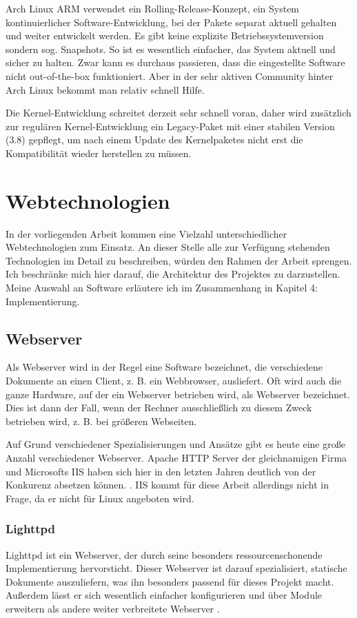 Arch Linux ARM verwendet ein Rolling-Release-Konzept, ein System kontinuierlicher Software-Entwicklung, bei der Pakete separat aktuell gehalten und weiter entwickelt werden. Es gibt keine explizite Betriebssystemversion sondern sog. Snapshots. So ist es  wesentlich einfacher, das System aktuell und sicher zu halten. Zwar kann es durchaus passieren, dass die eingestellte Software nicht out-of-the-box funktioniert. Aber in der sehr aktiven Community hinter Arch Linux bekommt man relativ schnell Hilfe.

Die Kernel-Entwicklung schreitet derzeit sehr schnell voran, daher wird zusätzlich zur regulären Kernel-Entwicklung  ein Legacy-Paket mit einer stabilen Version (3.8) gepflegt, um nach einem Update des Kernelpaketes nicht erst die Kompatibilität wieder herstellen zu müssen.


\section{Webtechnologien}
In der vorliegenden Arbeit kommen eine Vielzahl unterschiedlicher Webtechnologien zum Einsatz. An dieser Stelle alle zur Verfügung stehenden Technologien im Detail zu beschreiben, würden den Rahmen der Arbeit sprengen. Ich beschränke mich hier darauf, die Architektur des Projektes zu darzustellen. Meine Auswahl an Software erläutere ich im Zusammenhang in Kapitel 4: Implementierung.

\subsection{Webserver}
Als Webserver wird in der Regel eine Software bezeichnet, die verschiedene Dokumente an einen Client, z. B. ein Webbrowser, ausliefert. Oft wird auch die ganze Hardware, auf der ein Webserver betrieben wird, als Webserver bezeichnet. Dies ist dann der Fall, wenn der Rechner ausschließlich zu diesem Zweck betrieben wird, z. B. bei größeren Webseiten.

Auf Grund verschiedener Spezialisierungen und Ansätze gibt es heute eine große Anzahl verschiedener Webserver. Apache HTTP Server der gleichnamigen Firma und Microsofts IIS haben sich hier in den letzten Jahren deutlich von der Konkurenz absetzen können. \cite{webserversurvey1014}. IIS kommt für diese Arbeit allerdings nicht in Frage, da er nicht für Linux angeboten wird.

\subsubsection{Lighttpd}
Lighttpd ist ein Webserver, der durch seine besonders ressourcenschonende Implementierung hervorsticht. Dieser Webserver ist darauf spezialisiert, statische Dokumente auszuliefern, was ihn besonders passend für dieses Projekt macht. Außerdem lässt er sich wesentlich einfacher konfigurieren und über Module erweitern als andere weiter verbreitete Webserver \cite{krieg2009}.


